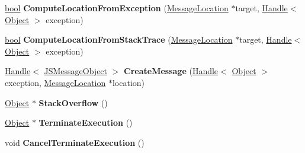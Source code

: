 \begin{DoxyCompactItemize}
\item 
\mbox{\label{classv8_1_1internal_1_1Isolate_a1b6bc3ecccbea6802d0cab258f87a686}} 
\mbox{\hyperlink{classbool}{bool}} {\bfseries Compute\+Location\+From\+Exception} (\mbox{\hyperlink{classv8_1_1internal_1_1MessageLocation}{Message\+Location}} $\ast$target, \mbox{\hyperlink{classv8_1_1internal_1_1Handle}{Handle}}$<$ \mbox{\hyperlink{classv8_1_1internal_1_1Object}{Object}} $>$ exception)
\item 
\mbox{\label{classv8_1_1internal_1_1Isolate_a1d016f6480e4a33563de1122c1bb2493}} 
\mbox{\hyperlink{classbool}{bool}} {\bfseries Compute\+Location\+From\+Stack\+Trace} (\mbox{\hyperlink{classv8_1_1internal_1_1MessageLocation}{Message\+Location}} $\ast$target, \mbox{\hyperlink{classv8_1_1internal_1_1Handle}{Handle}}$<$ \mbox{\hyperlink{classv8_1_1internal_1_1Object}{Object}} $>$ exception)
\item 
\mbox{\label{classv8_1_1internal_1_1Isolate_ab57f6fec4e74aa9994d89f584e62476f}} 
\mbox{\hyperlink{classv8_1_1internal_1_1Handle}{Handle}}$<$ \mbox{\hyperlink{classv8_1_1internal_1_1JSMessageObject}{J\+S\+Message\+Object}} $>$ {\bfseries Create\+Message} (\mbox{\hyperlink{classv8_1_1internal_1_1Handle}{Handle}}$<$ \mbox{\hyperlink{classv8_1_1internal_1_1Object}{Object}} $>$ exception, \mbox{\hyperlink{classv8_1_1internal_1_1MessageLocation}{Message\+Location}} $\ast$location)
\item 
\mbox{\label{classv8_1_1internal_1_1Isolate_aed0b4300eaf251291dadf3c93a8e507f}} 
\mbox{\hyperlink{classv8_1_1internal_1_1Object}{Object}} $\ast$ {\bfseries Stack\+Overflow} ()
\item 
\mbox{\label{classv8_1_1internal_1_1Isolate_a2e2c918ec2e8fa0efa312cff1306057a}} 
\mbox{\hyperlink{classv8_1_1internal_1_1Object}{Object}} $\ast$ {\bfseries Terminate\+Execution} ()
\item 
\mbox{\label{classv8_1_1internal_1_1Isolate_a5cb7af73c1baa2d1036c632bf48c1a6a}} 
void {\bfseries Cancel\+Terminate\+Execution} ()
\item 
\mbox{\label{classv8_1_1internal_1_1Isolate_a26b7bce2682f35560d3bd02cb4f68a3f}} 

\end{DoxyCompactItemize}
